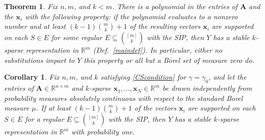 \documentclass[9pt,twocolumn]{pnas-new}
\newtheorem{theorem}{Theorem}
\newtheorem{corollary}{Corollary}
\begin{document}
\begin{theorem}\label{robustPolythm} %
Fix $n, m$, and $k < m$. There is a polynomial in the entries of $\mathbf{A}$ and the $\mathbf{x}_i$ with the following property:  if the polynomial evaluates to a nonzero number and at least \mbox{$(k-1){m \choose k}+1$} of the resulting vectors $\mathbf{x}_i$ are supported on each $S \in E$ for some regular $E \subseteq {[m] \choose k}$ with the SIP, then $Y$ has a stable $k$-sparse representation in $\mathbb{R}^m$ (Def.~\ref{maindef}). In particular, either no substitutions impart to $Y$ this property or all but a Borel set of measure zero do. 
\end{theorem}


\begin{corollary}\label{ProbabilisticCor}
Fix $n, m$, and $k$ satisfying \eqref{CScondition} for $\gamma = \gamma_0$, and let the entries of $\mathbf{A} \in \mathbb{R}^{n \times m}$ and $k$-sparse $\mathbf{x}_1, \ldots, \mathbf{x}_N \in \mathbb{R}^m$ be drawn independently from probability measures absolutely continuous with respect to the standard Borel measure $\mu$. If at least $(k-1){m \choose k} + 1$ of the vectors $\mathbf{x}_i$ are supported on each $S \in E$ for a regular $E \subseteq {[m] \choose k}$ with the SIP, then $Y$ has a stable $k$-sparse representation in $\mathbb{R}^m$ with probability one.
\end{corollary}



\end{document}

